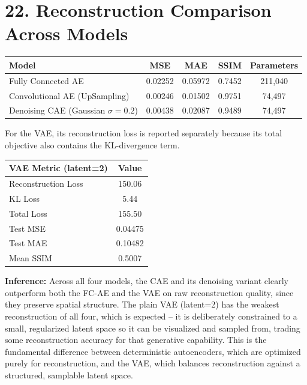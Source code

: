 \documentclass[10pt]{article}
\begin{document}
\section*{22. Reconstruction Comparison Across Models}

\begin{center}
\begin{tabular}{|l|c|c|c|c|}
\hline
Model & MSE & MAE & SSIM & Parameters\\
\hline
Fully Connected AE & 0.02252 & 0.05972 & 0.7452 & 211{,}040\\
Convolutional AE (UpSampling) & 0.00246 & 0.01502 & 0.9751 & 74{,}497\\
Denoising CAE (Gaussian $\sigma=0.2$) & 0.00438 & 0.02087 & 0.9489 & 74{,}497\\
\hline
\end{tabular}
\end{center}

For the VAE, its reconstruction loss is reported separately because its total
objective also contains the KL-divergence term.

\begin{center}
\begin{tabular}{|l|c|}
\hline
VAE Metric (latent=2) & Value\\
\hline
Reconstruction Loss & 150.06\\
KL Loss & 5.44\\
Total Loss & 155.50\\
Test MSE & 0.04475\\
Test MAE & 0.10482\\
Mean SSIM & 0.5007\\
\hline
\end{tabular}
\end{center}

\textbf{Inference:} Across all four models, the CAE and its denoising variant clearly outperform both the FC-AE and the VAE on raw reconstruction quality, since they preserve spatial structure. The plain VAE (latent=2) has the weakest reconstruction of all four, which is expected -- it is deliberately constrained to a small, regularized latent space so it can be visualized and sampled from, trading some reconstruction accuracy for that generative capability. This is the fundamental difference between deterministic autoencoders, which are optimized purely for reconstruction, and the VAE, which balances reconstruction against a structured, samplable latent space.
\end{document}
